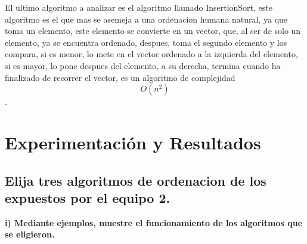 \documentclass[spanish]{article}
\begin{document}
	El ultimo algoritmo a analizar es el algoritmo llamado InsertionSort, este algoritmo es el que mas se asemeja a una ordenacion humana natural, ya que toma un elemento, este elemento se convierte en un vector, que, al ser de solo un elemento, ya se encuentra ordenado, despues, toma el segundo elemento y los compara, si es menor, lo mete en el vector ordenado a la izquierda del elemento, si es mayor, lo pone despues del elemento, a su derecha, termina cuando ha finalizado de recorrer el vector, es un algoritmo de complejidad $$O(n^2)$$.
	

	\newpage	

	\section{Experimentaci\'on y Resultados}
	
	\subsection{Elija tres algoritmos de ordenacion de los expuestos por el equipo 2.}
	
	{\large{ {\bf i) Mediante ejemplos, muestre el funcionamiento de los algoritmos que se eligieron.}}}\\

	\bigskip
\end{document}

